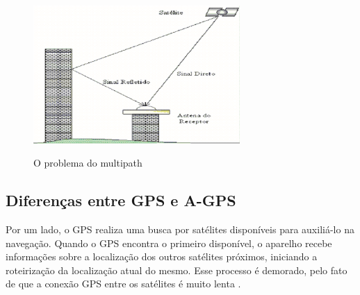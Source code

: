 \begin{figure}[H]
    \centering
    \caption{O problema do multipath}
    \includegraphics[width=0.7\textwidth]{./dados/figuras/fig3}
    \label{fig:figura-propagmultipath}
\end{figure}

\subsection{Diferenças entre GPS e A-GPS}


Por um lado, o GPS realiza uma busca por satélites disponíveis para auxiliá-lo na navegação. Quando o GPS encontra o primeiro disponível, o aparelho recebe informações sobre a localização dos outros satélites próximos, iniciando a roteirização da localização atual do mesmo. Esse processo é demorado, pelo fato de que a conexão GPS entre os satélites é muito lenta \cite{oficinanetagps:2018}.


